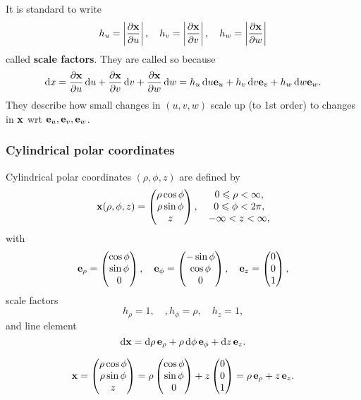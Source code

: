 It is standard to write 
\[
    h_u = \left| \frac{\partial {\bf x}}{\partial u}  \right| ,\quad h_v=\left| \frac{\partial {\bf x}}{\partial v}  \right|,\quad h_w=\left| \frac{\partial {\bf x}}{\partial w}  \right|
\]
called \textbf{scale factors}. They are called so because 
\[
    \mathrm{d} x = \frac{\partial {\bf x}}{\partial u}\,\mathrm{d} u+ \frac{\partial {\bf x}}{\partial v}\,\mathrm{d} v+\frac{\partial {\bf x}}{\partial w}\,\mathrm{d} w=h_u \,\mathrm{d} u {\bf e}_u+h_v \,\mathrm{d} v {\bf e}_v+h_w \,\mathrm{d} w {\bf e}_w.
\]
They describe how small changes in $ (u,v,w) $ scale up (to 1st order) to changes in ${\bf x}$ wrt $ {\bf e}_u,{\bf e}_v,{\bf e}_w $.

\subsubsection*{Cylindrical polar coordinates}
Cylindrical polar coordinates $ (\rho,\phi,z) $ are defined by 
\[
    {\bf x}(\rho,\phi,z)= \begin{pmatrix}
        \rho\cos \phi \\ \rho \sin \phi \\ z
    \end{pmatrix}, \quad\begin{matrix}
        0\leqslant \rho< \infty, \\ 0\leqslant \phi<2\pi,\\ -\infty <z<\infty,
    \end{matrix}
\]
with 
\[
    {\bf e}_\rho=\begin{pmatrix}
        \cos \phi \\ \sin \phi \\ 0
    \end{pmatrix},\quad
    {\bf e}_\phi=\begin{pmatrix}
        -\sin\phi \\ \cos \phi \\ 0
    \end{pmatrix},\quad
    {\bf e}_z=\begin{pmatrix}
        0 \\ 0 \\ 1
    \end{pmatrix},
\]
scale factors
\[
    h_\rho=1,\quad,h_\phi=\rho,\quad h_z=1,
\]
and line element
\[
    \mathrm{d} {\bf x} = \mathrm{d} \rho\, {\bf e}_\rho+\rho\,\mathrm{d} \phi \, {\bf e}_\phi+\mathrm{d} z \, {\bf e}_z.
\]
\begin{note}
    \[
        {\bf x}=\begin{pmatrix}
            \rho\cos \phi \\ \rho \sin \phi \\ z
        \end{pmatrix}=\rho\begin{pmatrix}
            \cos \phi \\  \sin \phi \\ 0
        \end{pmatrix}+z \begin{pmatrix}
            0 \\ 0 \\ 1
        \end{pmatrix}=\rho\, {\bf e}_\rho+z\, {\bf e}_z.
    \]
\end{note}

